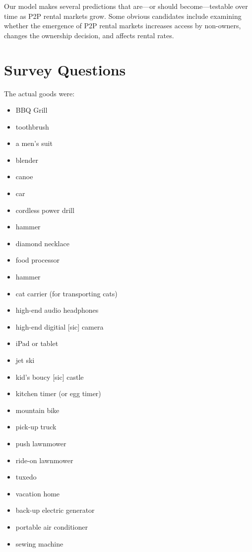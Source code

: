 \documentclass[11pt]{article}
\begin{document}
Our model makes several predictions that are---or should become---testable over time as P2P rental markets grow.
Some obvious candidates include examining whether the emergence of P2P rental markets increases access by non-owners, changes the ownership decision, and affects rental rates.





\newpage 

\appendix 

\section{Survey Questions \label{sec:survey}} 

The actual goods were: 

\begin{itemize} 
\item BBQ Grill
\item toothbrush
\item a men's suit
\item blender
\item canoe
\item car
\item cordless power drill
\item hammer
\item diamond necklace
\item food processor
\item hammer
\item cat carrier (for transporting cats)
\item high-end audio headphones
\item high-end digitial [sic] camera
\item iPad or tablet
\item jet ski
\item kid's boucy [sic] castle
\item kitchen timer (or egg timer)
\item mountain bike
\item pick-up truck
\item push lawnmower
\item ride-on lawnmower
\item tuxedo
 \item vacation home
\item back-up electric generator
\item portable air conditioner
\item sewing machine
\end{itemize} 
\end{document}
